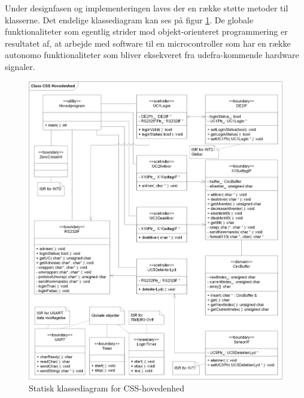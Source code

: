 Under designfasen og implementeringen laves der en række støtte metoder til klasserne. Det endelige klassediagram kan ses på  figur \ref{fig:CSS_hovedenhed_Class_Static}. De globale funktionaliteter som egentlig strider mod objekt-orienteret programmering er resultatet af, at arbejde med software til en microcontroller som har en række autonomo funktionaliteter som bliver eksekveret fra udefra-kommende hardware signaler.

\begin{figure}[!htb] \centering
     \includegraphics[width=\textwidth]{billeder/uml/CSS_hovedenhed_Class_Static}
     \caption{Statisk klassediagram for CSS-hovedenhed}
     \label{fig:CSS_hovedenhed_Class_Static}
\end{figure}